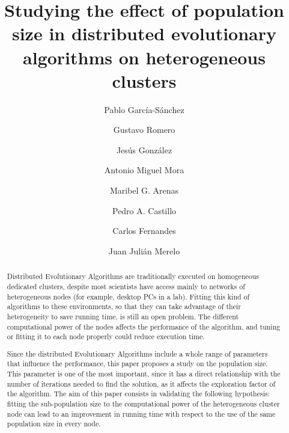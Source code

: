 \documentclass[final,1p,times]{elsarticle}
\begin{document}
\begin{frontmatter}



\title{Studying the effect of population size in distributed evolutionary
  algorithms on heterogeneous clusters}


\author[ugr]{Pablo Garc\'ia-S\'anchez}
\author[ugr]{Gustavo Romero}
\author[ugr]{Jes\'us Gonz\'alez}
\author[ugr]{Antonio Miguel Mora}
\author[ugr]{Maribel G. Arenas}
\author[ugr]{Pedro A. Castillo}
\author[laseeb]{Carlos Fernandes}
\author[ugr]{Juan Juli\'an Merelo}


\address[ugr]{Department of Computer Architecture and Computer Technology and CITIC-UGR, University of Granada, Granada, Spain. Tel: +34958241778. Fax: +34958248993}
\address[laseeb]{LaSEEB-ISR-IST, Technical University of Lisbon (IST), Lisbon, Portugal}%


\begin{abstract}


Distributed Evolutionary Algorithms are traditionally executed on homogeneous dedicated clusters, 
despite most scientists have access mainly to networks of heterogeneous nodes (for example, desktop PCs in a lab). 
Fitting this kind of algorithms to these environments, so that they
can take advantage of their heterogeneity to save running time, is
still an open problem. The different computational power of the nodes affects
the performance of the algorithm, and tuning or fitting it
to each node properly could reduce execution time. 

Since the distributed Evolutionary Algorithms include a whole range of parameters that influence the performance, 
this paper proposes a study on the population size. This parameter  is one of the most important, 
since it has a direct relationship with the number of iterations needed to find the solution, as it affects
the exploration factor of the algorithm. 
The aim of this paper consists in validating the following hypothesis: fitting the sub-population size to the computational power of the heterogeneous cluster node can lead to an improvement in running time with respect to the use of the same population size in every node. 


\end{abstract}
\end{frontmatter}
\end{document}

